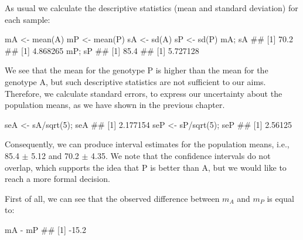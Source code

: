 \documentclass[a4paper,12pt,oneside]{book}
\newenvironment{Shaded}{\begin{snugshade}}{\end{snugshade}}
\newcommand{\DecValTok}[1]{#1}
\newcommand{\SpecialCharTok}[1]{#1}
\newcommand{\DocumentationTok}[1]{#1}
\newcommand{\OtherTok}[1]{#1}
\newcommand{\FunctionTok}[1]{#1}
\newcommand{\NormalTok}[1]{#1}
\begin{document}
As usual we calculate the descriptive statistics (mean and standard deviation) for each sample:

\begin{Shaded}
\begin{Highlighting}[]
\NormalTok{mA }\OtherTok{\textless{}{-}} \FunctionTok{mean}\NormalTok{(A)}
\NormalTok{mP }\OtherTok{\textless{}{-}} \FunctionTok{mean}\NormalTok{(P)}
\NormalTok{sA }\OtherTok{\textless{}{-}} \FunctionTok{sd}\NormalTok{(A)}
\NormalTok{sP }\OtherTok{\textless{}{-}} \FunctionTok{sd}\NormalTok{(P)}
\NormalTok{mA; sA}
\DocumentationTok{\#\# [1] 70.2}
\DocumentationTok{\#\# [1] 4.868265}
\NormalTok{mP; sP}
\DocumentationTok{\#\# [1] 85.4}
\DocumentationTok{\#\# [1] 5.727128}
\end{Highlighting}
\end{Shaded}

We see that the mean for the genotype P is higher than the mean for the genotype A, but such descriptive statistics are not sufficient to our aims. Therefore, we calculate standard errors, to express our uncertainty about the population means, as we have shown in the previous chapter.

\begin{Shaded}
\begin{Highlighting}[]
\NormalTok{seA }\OtherTok{\textless{}{-}}\NormalTok{ sA}\SpecialCharTok{/}\FunctionTok{sqrt}\NormalTok{(}\DecValTok{5}\NormalTok{); seA}
\DocumentationTok{\#\# [1] 2.177154}
\NormalTok{seP }\OtherTok{\textless{}{-}}\NormalTok{ sP}\SpecialCharTok{/}\FunctionTok{sqrt}\NormalTok{(}\DecValTok{5}\NormalTok{); seP}
\DocumentationTok{\#\# [1] 2.56125}
\end{Highlighting}
\end{Shaded}

Consequently, we can produce interval estimates for the population means, i.e., 85.4 \(\pm\) 5.12 and 70.2 \(\pm\) 4.35. We note that the confidence intervals do not overlap, which supports the idea that P is better than A, but we would like to reach a more formal decision.

First of all, we can see that the observed difference between \(m_A\) and \(m_P\) is equal to:

\begin{Shaded}
\begin{Highlighting}[]
\NormalTok{mA }\SpecialCharTok{{-}}\NormalTok{ mP}
\DocumentationTok{\#\# [1] {-}15.2}
\end{Highlighting}
\end{Shaded}
\end{document}

